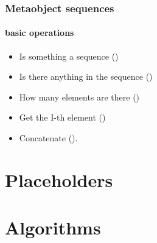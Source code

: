 \documentclass[compress,table,xcolor=table]{beamer}
\begin{document}
\begin{frame}
  \frametitle{Metaobject sequences}
  \framesubtitle{basic operations}
  \larger
  \begin{itemize}
    \item Is something a sequence ()
    \item Is there anything in the sequence ()
    \item How many elements are there ()
    \item Get the I-th element ()
    \item Concatenate ().
  \end{itemize}
\end{frame}
\section{Placeholders}
\section{Algorithms}
\end{document}
